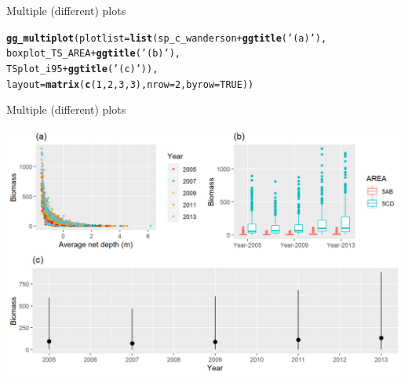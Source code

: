 \documentclass{beamer}\usepackage[]{graphicx}\usepackage[]{color}
\makeatletter
\newcommand{\hlnum}[1]{\textcolor[rgb]{0.686,0.059,0.569}{#1}}%
\newcommand{\hlstr}[1]{\textcolor[rgb]{0.192,0.494,0.8}{#1}}%
\newcommand{\hlopt}[1]{\textcolor[rgb]{0,0,0}{#1}}%
\newcommand{\hlstd}[1]{\textcolor[rgb]{0.345,0.345,0.345}{#1}}%
\newcommand{\hlkwc}[1]{\textcolor[rgb]{0.333,0.667,0.333}{#1}}%
\newcommand{\hlkwd}[1]{\textcolor[rgb]{0.737,0.353,0.396}{\textbf{#1}}}%
\newenvironment{kframe}{%
 \def\at@end@of@kframe{}%
 \ifinner\ifhmode%
  \def\at@end@of@kframe{\end{minipage}}%
  \begin{minipage}{\columnwidth}%
 \fi\fi%
 \def\FrameCommand##1{\hskip\@totalleftmargin \hskip-\fboxsep
 \colorbox{shadecolor}{##1}\hskip-\fboxsep
     \hskip-\linewidth \hskip-\@totalleftmargin \hskip\columnwidth}%
 \MakeFramed {\advance\hsize-\width
   \@totalleftmargin\z@ \linewidth\hsize
   \@setminipage}}%
 {\par\unskip\endMakeFramed%
 \at@end@of@kframe}
\newenvironment{knitrout}{}{} %
\makeatother
\begin{document}
\begin{frame}[fragile]{Multiple (different) plots}
\begin{knitrout}\footnotesize
{}\color{fgcolor}\begin{kframe}
\begin{alltt}
\hlkwd{gg_multiplot}\hlstd{(}\hlkwc{plotlist} \hlstd{=} \hlkwd{list}\hlstd{(sp_c_wanderson} \hlopt{+} \hlkwd{ggtitle}\hlstd{(}\hlstr{'(a)'}\hlstd{),}
                             \hlstd{boxplot_TS_AREA} \hlopt{+} \hlkwd{ggtitle}\hlstd{(}\hlstr{'(b)'}\hlstd{),}
                             \hlstd{TSplot_i95} \hlopt{+} \hlkwd{ggtitle}\hlstd{(}\hlstr{'(c)'}\hlstd{)),}
             \hlkwc{layout} \hlstd{=} \hlkwd{matrix}\hlstd{(}\hlkwd{c}\hlstd{(}\hlnum{1}\hlstd{,}\hlnum{2}\hlstd{,}\hlnum{3}\hlstd{,}\hlnum{3}\hlstd{),} \hlkwc{nrow}\hlstd{=}\hlnum{2}\hlstd{,} \hlkwc{byrow}\hlstd{=}\hlnum{TRUE}\hlstd{))}
\end{alltt}
\end{kframe}
\end{knitrout}
\end{frame}

\begin{frame}[fragile]{Multiple (different) plots}
\begin{knitrout}\footnotesize
{}\color{fgcolor}

{\centering \includegraphics[width=.9\linewidth]{figure/multi_plot4-1} 

}



\end{knitrout}
\end{frame}



\end{document}
